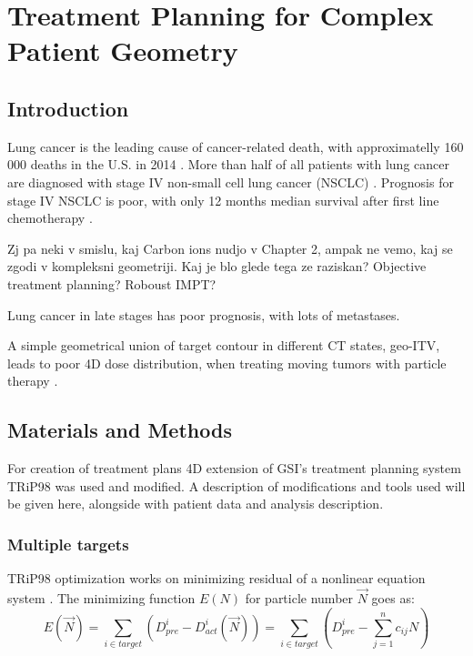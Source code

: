 \documentclass[type=dr, dr=rernat, accentcolor=tud7b,colorbacktitle, bigchapter, openright, twoside, 12pt ]{tudthesis}
\begin{document}
\chapter{Treatment Planning for Complex Patient Geometry}
\label{chapter:vmm}
\minitoc

\section{Introduction}

Lung cancer is the leading cause of cancer-related death, with approximatelly 160 000 deaths in the U.S. in 2014 \cite{Siegel2014}. More than half of all patients with lung cancer are diagnosed with stage IV non-small cell lung cancer (NSCLC) \cite{Ramalingam2008, Iyengar2014}.
Prognosis for stage IV NSCLC is poor, with only 12 months median survival after first line chemotherapy \cite{Socinski2013}.

Zj pa neki v smislu, kaj Carbon ions nudjo v Chapter 2, ampak ne vemo, kaj se zgodi v kompleksni geometriji. Kaj je blo glede tega ze raziskan? Objective treatment planning? Roboust IMPT?
 

Lung cancer in late stages has poor prognosis, with lots of metastases.

A simple geometrical union of target contour in different CT states, geo-ITV, leads to poor 4D dose distribution, when treating moving tumors with particle therapy \cite{Rietzel2010}.

\section{Materials and Methods}

For creation of treatment plans 4D extension of GSI's treatment planning system TRiP98 \cite{Kraemer2000a, Richter2013} was used and modified. A description of modifications and tools used will be given here, 
alongside with patient data and analysis description.

\subsection{Multiple targets}

TRiP98 optimization works on minimizing residual of a nonlinear equation system \cite{Kraemer2000a}. The minimizing function $E(N)$ for particle number $\vec{N}$ goes as:
\begin{equation}
\label{eq-costFunc}
 E(\vec{N}) = \sum_{i\in target} \left( D_{pre}^{i} - D_{act}^{i}(\vec{N})\right) = \sum_{i\in target} \left( D_{pre}^{i} -\sum_{j=1}^n c_{ij}N\right)
\end{equation}
\end{document}
